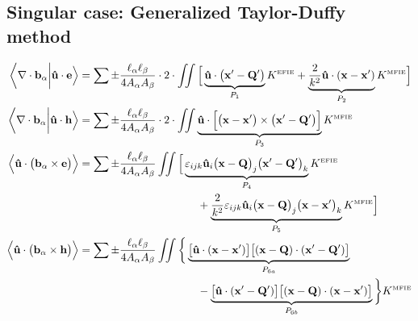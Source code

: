 \subsection*{Singular case: Generalized Taylor-Duffy method}

\begin{align*} 
 \bigg\langle \nabla \cdot \mathbf{b}_\alpha \bigg|  \mathbf{\hat u} \cdot \mathbf{e}  \Big\rangle
&= \sum \pm \frac{\ell_\alpha \ell_\beta}{4A_\alpha A_\beta}
   \cdot
   2\cdot\iint 
   \Big[ \underbrace{ \mathbf{\hat u}\cdot\big(\mathbf{x}^\prime-\mathbf{Q}^\prime\big)
                    }_{P_1} K^{\hbox{\tiny{EFIE}}}
        +\underbrace{ \frac{2}{k^2}\mathbf{\hat u}\cdot(\mathbf{x}-\mathbf{x}^\prime)
                    }_{P_2} K^{\hbox{\tiny{MFIE}}}
   \Big]
\\
 \bigg\langle \nabla \cdot \mathbf{b}_\alpha \bigg| \mathbf{\hat u} \cdot \mathbf{h} \Big\rangle
&= \sum \pm \frac{\ell_\alpha \ell_\beta}{4A_\alpha A_\beta}
   \cdot
   2\cdot
   \iint \underbrace{ \mathbf{\hat u}\cdot
                      \Big[ \big(\mathbf{x}-\mathbf{x}^\prime \big) \times
                            \big(\mathbf{x}^\prime-\mathbf{Q}^\prime \big)
                      \Big]
                    }_{P_3} K^{\hbox{\tiny{MFIE}}}
\\
 \Big\langle \mathbf{\hat u} \cdot \big(\mathbf{b}_\alpha \times \mathbf{e}\big) \Big\rangle
&= \sum \pm \frac{\ell_\alpha \ell_\beta}{4A_\alpha A_\beta}
   \iint
   \Big[ \underbrace{ \varepsilon_{ijk} 
                      \mathbf{\hat u}_i
                      \big(\mathbf{x}-\mathbf{Q}\big)_j
                      \big(\mathbf{x}^\prime-\mathbf{Q}^\prime\big)_k
                    }_{P_4} K^{\hbox{\tiny{EFIE}}}
\\
&\hspace{1.5in}
        +\underbrace{ \frac{2}{k^2} \varepsilon_{ijk}
                      \mathbf{\hat u}_i
                      \big(\mathbf{x}-\mathbf{Q}\big)_j
                      \big(\mathbf{x}-\mathbf{x}^\prime\big)_k
                    }_{P_5} K^{\hbox{\tiny{MFIE}}}
   \Big]
\\
 \Big\langle \mathbf{\hat u} \cdot \big(\mathbf{b}_\alpha \times \mathbf{h}\big) \Big\rangle
&= \sum \pm \frac{\ell_\alpha \ell_\beta}{4A_\alpha A_\beta}
   \iint
   \bigg\{ \underbrace{ \big[\mathbf{\hat u}\cdot(\mathbf{x}-\mathbf{x}^\prime)\big]
                        \big[(\mathbf{x}-\mathbf{Q})\cdot(\mathbf{x}^\prime-\mathbf{Q}^\prime)
                        \big]
                      }_{P_{6a}}
\\
&\hspace{1.5in}
          -\underbrace{ \big[\mathbf{\hat u}\cdot(\mathbf{x}^\prime-\mathbf{Q}^\prime)\big]
                        \big[(\mathbf{x}-\mathbf{Q})\cdot(\mathbf{x}-\mathbf{x}^\prime)
                        \big]
                      }_{P_{6b}}
   \bigg\} K^{\hbox{\tiny{MFIE}}}
\end{align*}
